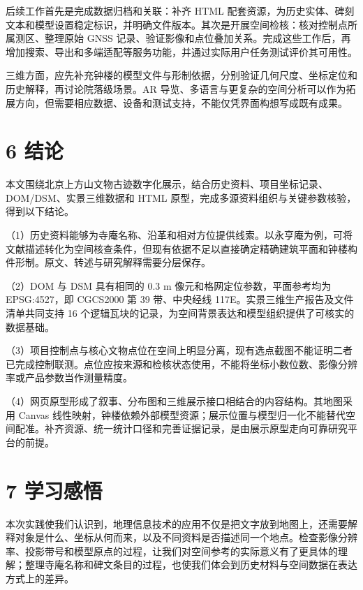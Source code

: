 \documentclass[UTF8,a4paper,zihao=-4]{ctexart}
\begin{document}
后续工作首先是完成数据归档和关联：补齐 HTML 配套资源，为历史实体、碑刻文本和模型设置稳定标识，并明确文件版本。其次是开展空间检核：核对控制点所属测区、整理原始 GNSS 记录、验证影像和点位叠加关系。完成这些工作后，再增加搜索、导出和多端适配等服务功能，并通过实际用户任务测试评价其可用性。


三维方面，应先补充钟楼的模型文件与形制依据，分别验证几何尺度、坐标定位和历史解释，再讨论院落级场景。AR 导览、多语言与更复杂的空间分析可以作为拓展方向，但需要相应数据、设备和测试支持，不能仅凭界面构想写成既有成果。


\section*{6 结论}

本文围绕北京上方山文物古迹数字化展示，结合历史资料、项目坐标记录、DOM/DSM、实景三维数据和 HTML 原型，完成多源资料组织与关键参数核验，得到以下结论。


（1）历史资料能够为寺庵名称、沿革和相对方位提供线索。以永亨庵为例，可将文献描述转化为空间核查条件，但现有依据不足以直接确定精确建筑平面和钟楼构件形制。原文、转述与研究解释需要分层保存。


（2）DOM 与 DSM 具有相同的 0.3 m 像元和格网定位参数，平面参考均为 EPSG:4527，即 CGCS2000 第 39 带、中央经线 117\textdegree{}E。实景三维生产报告及文件清单共同支持 16 个逻辑瓦块的记录，为空间背景表达和模型组织提供了可核实的数据基础。


（3）项目控制点与核心文物点位在空间上明显分离，现有选点截图不能证明二者已完成控制联测。点位应按来源和检核状态使用，不能将坐标小数位数、影像分辨率或产品参数当作测量精度。


（4）网页原型形成了叙事、分布图和三维展示接口相结合的内容结构。其地图采用 Canvas 线性映射，钟楼依赖外部模型资源；展示位置与模型归一化不能替代空间配准。补齐资源、统一统计口径和完善证据记录，是由展示原型走向可靠研究平台的前提。


\section*{7 学习感悟}

本次实践使我们认识到，地理信息技术的应用不仅是把文字放到地图上，还需要解释对象是什么、坐标从何而来，以及不同资料是否描述同一个地点。检查影像分辨率、投影带号和模型原点的过程，让我们对空间参考的实际意义有了更具体的理解；整理寺庵名称和碑文条目的过程，也使我们体会到历史材料与空间数据在表达方式上的差异。
\end{document}
